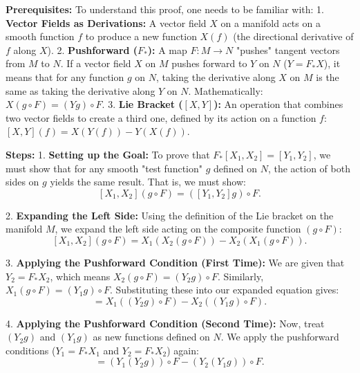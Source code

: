 \begin{solution}
\textbf{Prerequisites:}
To understand this proof, one needs to be familiar with:
1. \textbf{Vector Fields as Derivations:} A vector field $X$ on a manifold acts on a smooth function $f$ to produce a new function $X(f)$ (the directional derivative of $f$ along $X$).
2. \textbf{Pushforward ($F_*$):} A map $F: M \to N$ "pushes" tangent vectors from $M$ to $N$. If a vector field $X$ on $M$ pushes forward to $Y$ on $N$ ($Y = F_*X$), it means that for any function $g$ on $N$, taking the derivative along $X$ on $M$ is the same as taking the derivative along $Y$ on $N$. Mathematically: $X(g \circ F) = (Yg) \circ F$.
3. \textbf{Lie Bracket ($[X, Y]$):} An operation that combines two vector fields to create a third one, defined by its action on a function $f$: $[X, Y](f) = X(Y(f)) - Y(X(f))$.
\par\vspace{\baselineskip}

\textbf{Steps:}
1. \textbf{Setting up the Goal:}
To prove that $F_*[X_1, X_2] = [Y_1, Y_2]$, we must show that for any smooth "test function" $g$ defined on $N$, the action of both sides on $g$ yields the same result. That is, we must show:
\[ [X_1, X_2](g \circ F) = ([Y_1, Y_2]g) \circ F. \]
\par\vspace{\baselineskip}

2. \textbf{Expanding the Left Side:}
Using the definition of the Lie bracket on the manifold $M$, we expand the left side acting on the composite function $(g \circ F)$:
\[ [X_1, X_2](g \circ F) = X_1(X_2(g \circ F)) - X_2(X_1(g \circ F)). \]
\par\vspace{\baselineskip}

3. \textbf{Applying the Pushforward Condition (First Time):}
We are given that $Y_2 = F_*X_2$, which means $X_2(g \circ F) = (Y_2 g) \circ F$. Similarly, $X_1(g \circ F) = (Y_1 g) \circ F$. Substituting these into our expanded equation gives:
\[ = X_1((Y_2 g) \circ F) - X_2((Y_1 g) \circ F). \]
\par\vspace{\baselineskip}

4. \textbf{Applying the Pushforward Condition (Second Time):}
Now, treat $(Y_2 g)$ and $(Y_1 g)$ as new functions defined on $N$. We apply the pushforward conditions ($Y_1 = F_*X_1$ and $Y_2 = F_*X_2$) again:
\[ = (Y_1(Y_2 g)) \circ F - (Y_2(Y_1 g)) \circ F. \]
\par\vspace{\baselineskip}


\end{solution}
